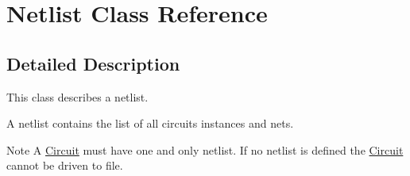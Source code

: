 \hypertarget{class_netlist}{}\section{Netlist Class Reference}
\label{class_netlist}


\subsection{Detailed Description}
This class describes a netlist.

A netlist contains the list of all circuit\textquotesingle{}s instances and nets.

\begin{DoxyNote}{Note}
A \mbox{\hyperlink{class_circuit}{Circuit}} must have one and only netlist. If no netlist is defined the \mbox{\hyperlink{class_circuit}{Circuit}} cannot be driven to file. 
\end{DoxyNote}
